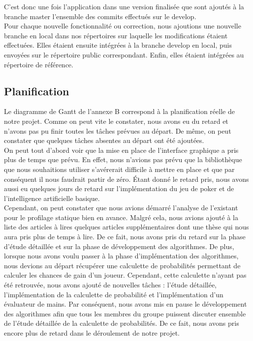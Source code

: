 \documentclass{report}
\begin{document}
C'est donc une fois l'application dans une version finalisée que sont ajoutés à la branche master l'ensemble des commits effectués sur le develop.\\

Pour chaque nouvelle fonctionnalité ou correction, nous ajoutions une nouvelle branche en local dans nos répertoires sur laquelle les modifications étaient effectuées. Elles étaient ensuite intégrées à la branche develop en local, puis envoyées sur le répertoire public correspondant. Enfin, elles étaient intégrées au répertoire de référence.\par

\subsection{Planification}
\hspace{0.5cm}Le diagramme de Gantt de l'annexe B correspond à la planification réelle de notre projet. Comme on peut vite le constater, nous avons eu du retard et n'avons pas pu finir toutes les tâches prévues au départ. De même, on peut constater que quelques tâches absentes au départ ont été ajoutées.\\

On peut tout d'abord voir que la mise en place de l'interface graphique a pris plus de temps que prévu. En effet, nous n'avions pas prévu que la bibliothèque que nous souhaitions utiliser s’avérerait difficile à mettre en place et que par conséquent il nous faudrait partir de zéro. Étant donné le retard pris, nous avons aussi eu quelques jours de retard sur l'implémentation du jeu de poker et de l'intelligence artificielle basique. \\

Cependant, on peut constater que nous avions démarré l'analyse de l'existant pour le profilage statique bien en avance. Malgré cela, nous avions ajouté à la liste des articles à lires quelques articles supplémentaires dont une thèse qui nous aura pris plus de temps à lire. De ce fait, nous avons pris du retard sur la phase d'étude détaillée et sur la phase de développement des algorithmes. De plus, lorsque nous avons voulu passer à la phase d'implémentation des algorithmes, nous devions au départ récupérer une calculette de probabilités permettant de calculer les chances de gain d'un joueur. Cependant, cette calculette n'ayant pas été retrouvée, nous avons ajouté de nouvelles tâches : l'étude détaillée, l'implémentation de la calculette de probabilité et l'implémentation d'un évaluateur de mains. Par conséquent, nous avons mis en pause le développement des algorithmes afin que tous les membres du groupe puissent discuter ensemble de l'étude détaillée de la calculette de probabilités. De ce fait, nous avons pris encore plus de retard dans le déroulement de notre projet. \\
\end{document}
